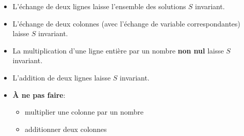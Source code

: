 \documentclass[
    11pt,
    a4paper,
    oneside,
    headinlcude, footinclude,
    twoside,
]{report}
\begin{document}
\begin{itemize}
    \item L'échange de deux lignes laisse l'ensemble des solutions $S$
        invariant.

    \item L'échange de deux colonnes (avec l'échange de variable
        correspondantes) laisse $S$ invariant.

    \item La multiplication d'une ligne entière par un nombre \textbf{non nul} 
        laisse $S$ invariant.

    \item L'addition de deux lignes laisse $S$ invariant.

    \item \textbf{À ne pas faire}:
        \begin{itemize}
            \item multiplier une colonne par un nombre
            \item additionner deux colonnes
        \end{itemize}
\end{itemize}
\end{document}
